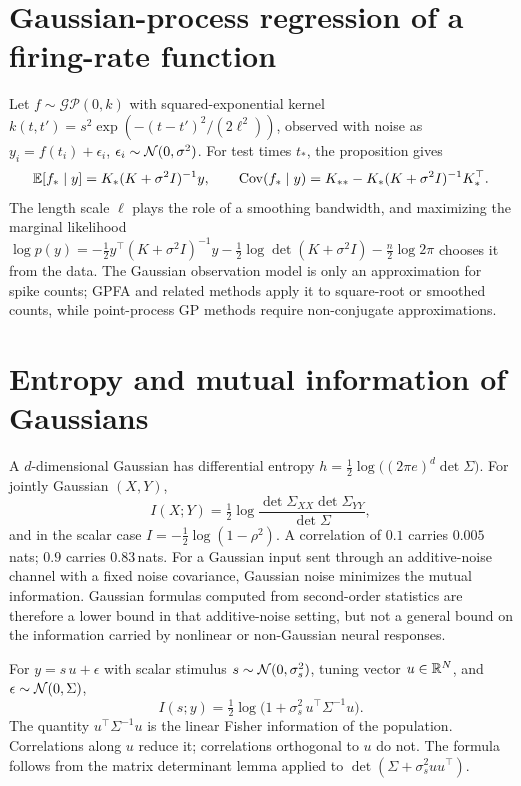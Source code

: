 \section{Gaussian-process regression of a firing-rate function}
Let $f\sim\mathcal{GP}(0,k)$ with squared-exponential kernel
$k(t,t')=s^2\exp(-(t-t')^2/(2\ell^2))$, observed with noise as
$y_i=f(t_i)+\epsilon_i$, $\epsilon_i\sim\mathcal{N}(0,\sigma^2)$. For test
times $t_\ast$, the proposition gives
\[
\mathbb{E}[f_\ast\mid y]=K_{\ast}(K+\sigma^2I)^{-1}y,\qquad
\operatorname{Cov}(f_\ast\mid y)=K_{\ast\ast}-K_\ast(K+\sigma^2I)^{-1}K_\ast^\top.
\]
The length scale $\ell$ plays the role of a smoothing bandwidth, and
maximizing the marginal likelihood
$\log p(y)=-\tfrac12y^\top(K+\sigma^2I)^{-1}y-\tfrac12\log\det(K+\sigma^2I)-\tfrac n2\log2\pi$
chooses it from the data. The Gaussian observation model is only an
approximation for spike counts; GPFA and related methods apply it to
square-root or smoothed counts, while point-process GP methods require
non-conjugate approximations.

\section{Entropy and mutual information of Gaussians}
A $d$-dimensional Gaussian has differential entropy
$h=\tfrac12\log\bigl((2\pi e)^d\det\Sigma\bigr)$. For jointly Gaussian
$(X,Y)$,
\[
I(X;Y)=\tfrac12\log\frac{\det\Sigma_{XX}\det\Sigma_{YY}}{\det\Sigma},
\]
and in the scalar case $I=-\tfrac12\log(1-\rho^2)$. A correlation of
$0.1$ carries $0.005$\,nats; $0.9$ carries $0.83$\,nats. For a Gaussian input sent through an additive-noise channel with a
fixed noise covariance, Gaussian noise minimizes the mutual information.
Gaussian formulas computed from second-order statistics are therefore a
lower bound in that additive-noise setting, but not a general bound on
the information carried by nonlinear or non-Gaussian neural responses.

\begin{example}
For $y=s\,u+\epsilon$ with scalar stimulus $s\sim\mathcal{N}(0,\sigma_s^2)$,
tuning vector $u\in\mathbb{R}^N$, and $\epsilon\sim\mathcal{N}(0,\Sigma)$,
\[
I(s;y)=\tfrac12\log\bigl(1+\sigma_s^2\,u^\top\Sigma^{-1}u\bigr).
\]
The quantity $u^\top\Sigma^{-1}u$ is the linear Fisher information of the
population. Correlations along $u$ reduce it; correlations orthogonal to
$u$ do not. The formula follows from the matrix determinant lemma
applied to $\det(\Sigma+\sigma_s^2uu^\top)$.
\end{example}


